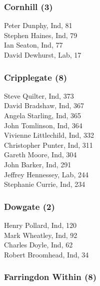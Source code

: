 \documentclass[a4paper,openany,10pt]{book}
\begin{document}
\subsubsection*{Cornhill (3)}



Peter Dunphy, Ind, 81\\
Stephen Haines, Ind, 79\\
Ian Seaton, Ind, 77\\
David Dewhurst, Lab, 17\\


\subsubsection*{Cripplegate (8)}



Steve Quilter, Ind, 373\\
David Bradshaw, Ind, 367\\
Angela Starling, Ind, 365\\
John Tomlinson, Ind, 364\\
Vivienne Littlechild, Ind, 332\\
Christopher Punter, Ind, 311\\
Gareth Moore, Ind, 304\\
John Barker, Ind, 291\\
Jeffrey Hennessey, Lab, 244\\
Stephanie Currie, Ind, 234\\


\subsubsection*{Dowgate (2)}



Henry Pollard, Ind, 120\\
Mark Wheatley, Ind, 92\\
Charles Doyle, Ind, 62\\
Robert Broomhead, Ind, 34\\


\subsubsection*{Farringdon Within (8)}

\end{document}
